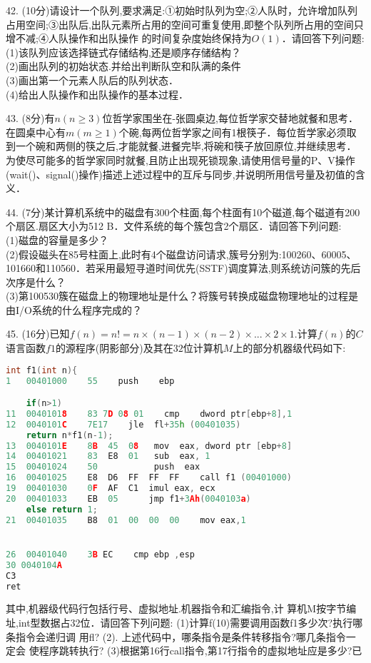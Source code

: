 42. (10分)请设计一个队列,要求满足:①初始时队列为空;②人队时，允许增加队列占用空间;③出队后,出队元素所占用的空间可重复使用,即整个队列所占用的空间只增不减;④人队操作和出队操作
的时间复杂度始终保持为$O(1)$．请回答下列问题: \\
(1)该队列应该选择链式存储结构,还是顺序存储结构？ \\
(2)画出队列的初始状态.并给出判断队空和队满的条件 \\
(3)画出第一个元素人队后的队列状态． \\
(4)给出人队操作和出队操作的基本过程．

43. (8分)有$n(n\geqslant3)$位哲学家围坐在-张圆桌边,每位哲学家交替地就餐和思考．在圆桌中心有$m(m\geqslant1)$个碗,每两位哲学家之间有1根筷子．每位哲学家必须取到一个碗和两侧的筷之后,才能就餐,进餐完毕,将碗和筷子放回原位,并继续思考．为使尽可能多的哲学家同时就餐,且防止出现死锁现象,请使用信号量的P、V操作(wait()、signal()操作)描述上述过程中的互斥与同步,并说明所用信号量及初值的含义．

44. (7分)某计算机系统中的磁盘有300个柱面,每个柱面有10个磁道,每个磁道有200个扇区.扇区大小为512 B．文件系统的每个簇包含2个扇区．请回答下列问题: \\
(1)磁盘的容量是多少？ \\
(2)假设磁头在85号柱面上,此时有4个磁盘访问请求,簇号分别为:100260、60005、101660和110560．若采用最短寻道时间优先(SSTF)调度算法,则系统访问簇的先后次序是什么？ \\
(3)第100530簇在磁盘上的物理地址是什么？将簇号转换成磁盘物理地址的过程是由I/O系统的什么程序完成的？

45. (16分)已知$f(n)=n!=n\times(n-1)\times(n-2)\times...\times2\times1$.计算$f(n)$的$C$语言函数$f1$的源程序(阴影部分)及其在$32$位计算机$M$上的部分机器级代码如下:
\begin{lstlisting}[language=cpp]
int f1(int n){
1   00401000    55    push    ebp

    if(n>1)
11  00401018    83 7D 08 01    cmp    dword ptr[ebp+8],1
12  0040101C    7E17    jle  fl+35h (00401035)
    return n*f1(n-1);
13  0040101E    8B  45  08   mov  eax, dword ptr [ebp+8]
14  00401021    83  E8  01   sub  eax, 1
15  00401024    50           push  eax
16  00401025    E8  D6  FF  FF  FF    call f1 (00401000)
19  00401030    0F  AF  C1  imul eax, ecx
20  00401033    EB  05      jmp f1+3Ah(0040103a)
    else return 1;
21  00401035    B8  01  00  00  00    mov eax,1


26  00401040    3B EC    cmp ebp ,esp
30 0040104A
C3
ret
\end{lstlisting}
其中,机器级代码行包括行号、虚拟地址.机器指令和汇编指令,计
算机M按字节编址,int型数据占32位．请回答下列问题:
(1)计算f(10)需要调用函数f1多少次?执行哪条指令会递归调
用fl?
(2). 上述代码中，哪条指令是条件转移指令?哪几条指令一定会
使程序跳转执行?
(3)根据第16行call指令,第17行指令的虚拟地址应是多少?已
